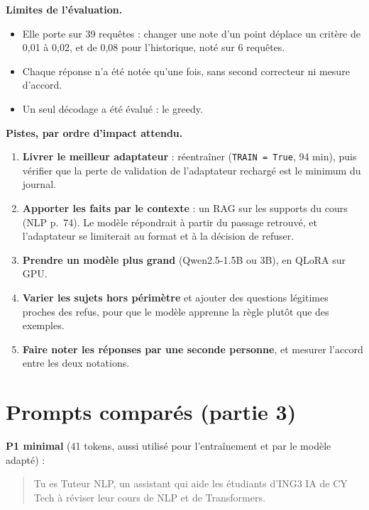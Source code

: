 \documentclass[10pt,a4paper]{article}
\newcommand{\code}[1]{\texttt{\small #1}}
\begin{document}
\textbf{Limites de l'évaluation.}
\begin{itemize}
\item Elle porte sur 39 requêtes : changer une note d'un point déplace un critère de 0,01 à 0,02,
  et de 0,08 pour l'historique, noté sur 6 requêtes.
\item Chaque réponse n'a été notée qu'une fois, sans second correcteur ni mesure d'accord.
\item Un seul décodage a été évalué : le greedy.
\end{itemize}

\textbf{Pistes, par ordre d'impact attendu.}
\begin{enumerate}
\item \textbf{Livrer le meilleur adaptateur} : réentraîner (\code{TRAIN = True}, 94 min),
  puis vérifier que la perte de validation de l'adaptateur rechargé est le minimum du journal.
\item \textbf{Apporter les faits par le contexte} : un RAG sur les supports du cours (NLP p.~74).
  Le modèle répondrait à partir du passage retrouvé, et l'adaptateur se limiterait au format et à
  la décision de refuser.
\item \textbf{Prendre un modèle plus grand} (Qwen2.5-1.5B ou 3B), en QLoRA sur GPU.
\item \textbf{Varier les sujets hors périmètre} et ajouter des questions légitimes proches des
  refus, pour que le modèle apprenne la règle plutôt que des exemples.
\item \textbf{Faire noter les réponses par une seconde personne}, et mesurer l'accord entre les deux
  notations.
\end{enumerate}

\clearpage
\appendix
\renewcommand{\thesection}{\Alph{section}}
\section{Prompts comparés (partie 3)}

\textbf{P1 minimal} (41 tokens, aussi utilisé pour l'entraînement et par le modèle adapté) :
\begin{quote}\small
Tu es Tuteur NLP, un assistant qui aide les étudiants d'ING3 IA de CY Tech à réviser leur cours de
NLP et de Transformers.
\end{quote}
\end{document}
